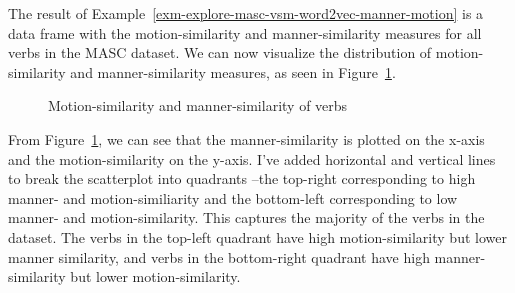 \documentclass[
  letterpaper,
  krantz1]{latex/krantz-mod}
\theoremstyle{definition}
\theoremstyle{definition}
\theoremstyle{remark}
\begin{document}
The result of Example~\ref{exm-explore-masc-vsm-word2vec-manner-motion}
is a data frame with the motion-similarity and manner-similarity
measures for all verbs in the MASC dataset. We can now visualize the
distribution of motion-similarity and manner-similarity measures, as
seen in
Figure~\ref{fig-explore-masc-vsm-word2vec-manner-motion-compare}.

\begin{figure}[!htb]


\caption{\label{fig-explore-masc-vsm-word2vec-manner-motion-compare}Motion-similarity
and manner-similarity of verbs}

\end{figure}%

From Figure~\ref{fig-explore-masc-vsm-word2vec-manner-motion-compare},
we can see that the manner-similarity is plotted on the x-axis and the
motion-similarity on the y-axis. I've added horizontal and vertical
lines to break the scatterplot into quadrants --the top-right
corresponding to high manner- and motion-similiarity and the bottom-left
corresponding to low manner- and motion-similarity. This captures the
majority of the verbs in the dataset. The verbs in the top-left quadrant
have high motion-similarity but lower manner similarity, and verbs in
the bottom-right quadrant have high manner-similarity but lower
motion-similarity.
\end{document}

